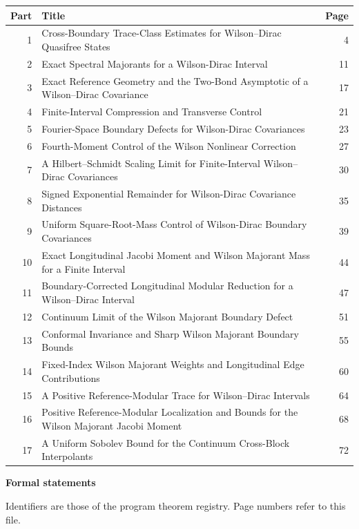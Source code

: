 \documentclass[11pt,a4paper]{article}
\begin{document}
{\small\begin{longtable}{@{}r>{\raggedright\arraybackslash}p{}r@{}}
\toprule Part & Title & Page\\\midrule\endhead
1 & Cross-Boundary Trace-Class Estimates for Wilson–Dirac Quasifree States & 4\\
2 & Exact Spectral Majorants for a Wilson-Dirac Interval & 11\\
3 & Exact Reference Geometry and the Two-Bond Asymptotic of a Wilson–Dirac Covariance & 17\\
4 & Finite-Interval Compression and Transverse Control & 21\\
5 & Fourier-Space Boundary Defects for Wilson-Dirac Covariances & 23\\
6 & Fourth-Moment Control of the Wilson Nonlinear Correction & 27\\
7 & A Hilbert--Schmidt Scaling Limit for Finite-Interval Wilson--Dirac Covariances & 30\\
8 & Signed Exponential Remainder for Wilson-Dirac Covariance Distances & 35\\
9 & Uniform Square-Root-Mass Control of Wilson-Dirac Boundary Covariances & 39\\
10 & Exact Longitudinal Jacobi Moment and Wilson Majorant Mass for a Finite Interval & 44\\
11 & Boundary-Corrected Longitudinal Modular Reduction for a Wilson–Dirac Interval & 47\\
12 & Continuum Limit of the Wilson Majorant Boundary Defect & 51\\
13 & Conformal Invariance and Sharp Wilson Majorant Boundary Bounds & 55\\
14 & Fixed-Index Wilson Majorant Weights and Longitudinal Edge Contributions & 60\\
15 & A Positive Reference-Modular Trace for Wilson–Dirac Intervals & 64\\
16 & Positive Reference-Modular Localization and Bounds for the Wilson Majorant Jacobi Moment & 68\\
17 & A Uniform Sobolev Bound for the Continuum Cross-Block Interpolants & 72\\
\bottomrule\end{longtable}}
\vspace{2mm}\textbf{Formal statements}\par\vspace{1mm}
{\footnotesize Identifiers are those of the program theorem registry. Page numbers refer to this file.\par}
\end{document}
